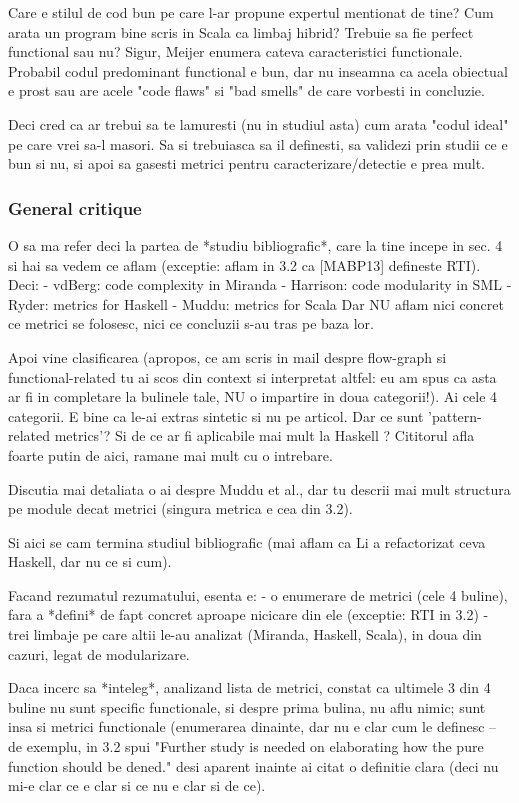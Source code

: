 \documentclass{article}
\begin{document}
Care e stilul de cod bun pe care l-ar propune expertul mentionat de tine?
Cum arata un program bine scris in Scala ca limbaj hibrid?
Trebuie sa fie perfect functional sau nu?
Sigur, Meijer enumera cateva caracteristici functionale. Probabil codul
predominant functional e bun, dar nu inseamna ca acela obiectual e prost
sau are acele "code flaws" si "bad smells" de care vorbesti in concluzie.

Deci cred ca ar trebui sa te lamuresti (nu in studiul asta) cum arata
"codul ideal" pe care vrei sa-l masori. Sa si trebuiasca sa il definesti,
sa validezi prin studii ce e bun si nu, si apoi sa gasesti metrici
pentru caracterizare/detectie e prea mult.

\subsubsection {General critique}


O sa ma refer deci la partea de *studiu bibliografic*, care la tine
incepe in sec. 4 si hai sa vedem ce aflam (exceptie: aflam in 3.2 ca
[MABP13] defineste RTI). Deci:
- vdBerg: code complexity in Miranda
- Harrison: code modularity in SML
- Ryder: metrics for Haskell
- Muddu: metrics for Scala
Dar NU aflam nici concret ce metrici se folosesc, nici ce concluzii
s-au tras pe baza lor.

Apoi vine clasificarea (apropos, ce am scris in mail despre flow-graph
si functional-related tu ai scos din context si interpretat altfel:
eu am spus ca asta ar fi in completare la bulinele tale, NU o impartire
in doua categorii!).
Ai cele 4 categorii. E bine ca le-ai extras sintetic si nu pe articol.
Dar ce sunt 'pattern-related metrics'? Si de ce ar fi aplicabile
mai mult la Haskell ? Cititorul afla foarte putin de aici, ramane mai
mult cu o intrebare.

Discutia mai detaliata o ai despre Muddu et al., dar tu descrii mai
mult structura pe module decat metrici (singura metrica e cea din 3.2).

Si aici se cam termina studiul bibliografic (mai aflam ca Li a
refactorizat ceva Haskell, dar nu ce si cum).

Facand rezumatul rezumatului, esenta e:
- o enumerare de metrici (cele 4 buline), fara a *defini* de fapt
concret aproape nicicare din ele (exceptie: RTI in 3.2)
- trei limbaje pe care altii le-au analizat (Miranda, Haskell, Scala),
in doua din cazuri, legat de modularizare.

Daca incerc sa *inteleg*, analizand lista de metrici, constat ca
ultimele 3 din 4 buline nu sunt specific functionale, si despre prima
bulina, nu aflu nimic; sunt insa si metrici functionale (enumerarea
dinainte, dar nu e clar cum le definesc -- de exemplu, in 3.2 spui
"Further study is needed on elaborating how the pure function should be
dened." desi aparent inainte ai citat o definitie clara (deci nu mi-e
clar ce e clar si ce nu e clar si de ce).
\end{document}
